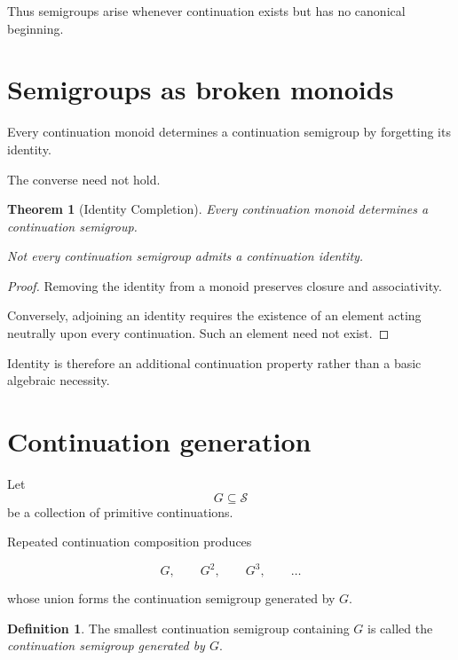 \documentclass[13pt,openany]{book}
\theoremstyle{plain}
\newtheorem{theorem}{Theorem}[chapter]
\theoremstyle{definition}
\newtheorem{definition}{Definition}[chapter]
\begin{document}
Thus semigroups arise whenever continuation exists but has no canonical
beginning.

\section{Semigroups as broken monoids}

Every continuation monoid determines a continuation semigroup by forgetting its
identity.

The converse need not hold.

\begin{theorem}[Identity Completion]
Every continuation monoid determines a continuation semigroup.

Not every continuation semigroup admits a continuation identity.
\end{theorem}

\begin{proof}
Removing the identity from a monoid preserves closure and associativity.

Conversely, adjoining an identity requires the existence of an element acting
neutrally upon every continuation. Such an element need not exist.
\end{proof}

Identity is therefore an additional continuation property rather than a basic
algebraic necessity.

\section{Continuation generation}

Let
\[
G\subseteq\mathcal S
\]
be a collection of primitive continuations.

Repeated continuation composition produces

\[
G,
\qquad
G^2,
\qquad
G^3,
\qquad
\ldots
\]

whose union forms the continuation semigroup generated by $G$.

\begin{definition}
The smallest continuation semigroup containing $G$ is called the
\emph{continuation semigroup generated by $G$}.
\end{definition}
\end{document}
